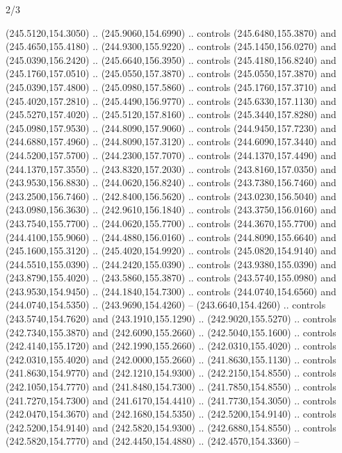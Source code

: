\begin{flagdescription}{2/3}
\begin{scope}[xshift=0.5\flaglength,yshift=0.5\flagwidth,scale=\flagwidth/259.2]
\begin{scope}[y=0.8pt, x=0.8pt, yscale=-1,shift={(-243,-162)}]
      (245.5120,154.3050) .. (245.9060,154.6990) .. controls (245.6480,155.3870) and
      (245.4650,155.4180) .. (244.9300,155.9220) .. controls (245.1450,156.0270) and
      (245.0390,156.2420) .. (245.6640,156.3950) .. controls (245.4180,156.8240) and
      (245.1760,157.0510) .. (245.0550,157.3870) .. controls (245.0550,157.3870) and
      (245.0390,157.4800) .. (245.0980,157.5860) .. controls (245.1760,157.3710) and
      (245.4020,157.2810) .. (245.4490,156.9770) .. controls (245.6330,157.1130) and
      (245.5270,157.4020) .. (245.5120,157.8160) .. controls (245.3440,157.8280) and
      (245.0980,157.9530) .. (244.8090,157.9060) .. controls (244.9450,157.7230) and
      (244.6880,157.4960) .. (244.8090,157.3120) .. controls (244.6090,157.3440) and
      (244.5200,157.5700) .. (244.2300,157.7070) .. controls (244.1370,157.4490) and
      (244.1370,157.3550) .. (243.8320,157.2030) .. controls (243.8160,157.0350) and
      (243.9530,156.8830) .. (244.0620,156.8240) .. controls (243.7380,156.7460) and
      (243.2500,156.7460) .. (242.8400,156.5620) .. controls (243.0230,156.5040) and
      (243.0980,156.3630) .. (242.9610,156.1840) .. controls (243.3750,156.0160) and
      (243.7540,155.7700) .. (244.0620,155.7700) .. controls (244.3670,155.7700) and
      (244.4100,155.9060) .. (244.4880,156.0160) .. controls (244.8090,155.6640) and
      (245.1600,155.3120) .. (245.4020,154.9920) .. controls (245.0820,154.9140) and
      (244.5510,155.0390) .. (244.2420,155.0390) .. controls (243.9380,155.0390) and
      (243.8790,155.4020) .. (243.5860,155.3870) .. controls (243.5740,155.0980) and
      (243.9530,154.9450) .. (244.1840,154.7300) .. controls (244.0740,154.6560) and
      (244.0740,154.5350) .. (243.9690,154.4260) -- (243.6640,154.4260) .. controls
      (243.5740,154.7620) and (243.1910,155.1290) .. (242.9020,155.5270) .. controls
      (242.7340,155.3870) and (242.6090,155.2660) .. (242.5040,155.1600) .. controls
      (242.4140,155.1720) and (242.1990,155.2660) .. (242.0310,155.4020) .. controls
      (242.0310,155.4020) and (242.0000,155.2660) .. (241.8630,155.1130) .. controls
      (241.8630,154.9770) and (242.1210,154.9300) .. (242.2150,154.8550) .. controls
      (242.1050,154.7770) and (241.8480,154.7300) .. (241.7850,154.8550) .. controls
      (241.7270,154.7300) and (241.6170,154.4410) .. (241.7730,154.3050) .. controls
      (242.0470,154.3670) and (242.1680,154.5350) .. (242.5200,154.9140) .. controls
      (242.5200,154.9140) and (242.5820,154.9300) .. (242.6880,154.8550) .. controls
      (242.5820,154.7770) and (242.4450,154.4880) .. (242.4570,154.3360) --

\end{scope}
\end{scope}
\end{flagdescription}
